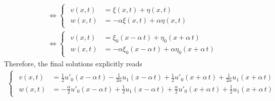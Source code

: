 \documentclass[12pt]{article}
\begin{document}
\begin{enumerate}
\begin{align}
		       & \Leftrightarrow 
		      \begin{cases}
			      \begin{aligned}
				      v(x,t) & = \xi(x,t) + \eta(x,t)              \\
				      w(x,t) & = -\alpha\xi(x,t) + \alpha\eta(x,t)
			      \end{aligned}
		      \end{cases}       \\
		       & \Leftrightarrow 
		      \begin{cases}
			      \begin{aligned}
				      v(x,t) & = \xi_{0}(x-\alpha\,t) + \eta_{0}(x+\alpha\,t)              \\
				      w(x,t) & = -\alpha\xi_{0}(x-\alpha\,t) + \alpha\eta_{0}(x+\alpha\,t)
			      \end{aligned}
		      \end{cases}
	      \end{align}
	      Therefore, the final solutions explicitly reads
	      \begin{align}
		      \begin{cases}
			      \begin{aligned}
				      v(x,t) & = 
				      \frac{1}{2}u'_{0}(x-\alpha\,t)-\frac{1}{2\alpha}u_{1}(x-\alpha\,t)
				      +
				      \frac{1}{2}u'_{0}(x+\alpha\,t)+\frac{1}{2\alpha}u_{1}(x+\alpha\,t) \\
				      w(x,t) & = 
				      -\frac{\alpha}{2}u'_{0}(x-\alpha\,t)+\frac{1}{2}u_{1}(x-\alpha\,t) 
				      + 
				      \frac{\alpha}{2}u'_{0}(x+\alpha\,t)+\frac{1}{2}u_{1}(x+\alpha\,t)
			      \end{aligned}
		      \end{cases}
	      \end{align}
\end{enumerate}
\end{document}
